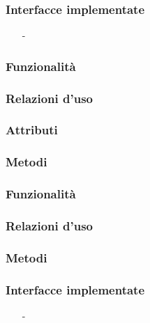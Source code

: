 \subsubsection*{Interfacce implementate}
\begin{itemize}[noitemsep,nolistsep]
  \item[-] 
\end{itemize}

\subsubsection*{Funzionalità}

\subsubsection*{Relazioni d'uso}

\subsubsection*{Attributi}

\subsubsection*{Metodi}


\subsubsection*{Funzionalità}

\subsubsection*{Relazioni d'uso}

\subsubsection*{Metodi}


\subsubsection*{Interfacce implementate}
\begin{itemize}[noitemsep,nolistsep]
  \item[-] 
\end{itemize}

